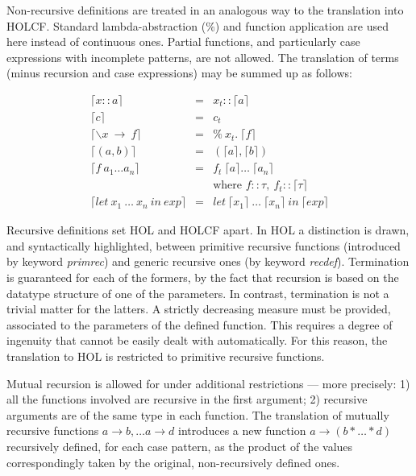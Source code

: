 \documentclass[a4paper,12pt]{article}
\begin{document}
Non-recursive definitions are treated in an analogous way to the
translation into HOLCF. Standard lambda-abstraction ($\%$) and
function application are used here instead of continuous ones. Partial
functions, and particularly case expressions with incomplete patterns,
are not allowed. The translation of terms (minus recursion and case
expressions) may be summed up as follows:

$$\begin{array}{lcl} 
  \lceil x::a \rceil & = & x_{t}::\lceil a \rceil \\
  \lceil c \rceil & = & c_{t} \\
  \lceil \backslash x \ \to \ f \rceil & = & \% \ x_{t}. \ \lceil f \rceil \\
  \lceil (a,b) \rceil & = & (\lceil a \rceil, \lceil b \rceil) \\
  \lceil f \ a_{1} \ldots a_{n} \rceil & = & f_{t} \ \lceil a \rceil \ldots \  \lceil a_{n} \rceil \\
  & & \mbox{where } f::\tau, \ f_{t}::\lceil \tau \rceil \\
  \lceil let \ x_{1} \ \dots \ x_{n} \ in \ exp \rceil & = 
  & let \ \lceil x_{1} \rceil \ \dots \ \lceil x_{n} \rceil \ in \ \lceil exp \rceil 
\end{array}$$

\noindent Recursive definitions set HOL and HOLCF apart.  In HOL a
distinction is drawn, and syntactically highlighted, between primitive
recursive functions (introduced by keyword \emph{primrec}) and generic
recursive ones (by keyword \emph{recdef}).  Termination is guaranteed
for each of the formers, by the fact that recursion is based on the
datatype structure of one of the parameters. In contrast, termination
is not a trivial matter for the latters. A strictly decreasing measure
must be provided, associated to the parameters of the defined
function. This requires a degree of ingenuity that cannot be easily
dealt with automatically. For this reason, the translation to HOL is
restricted to primitive recursive functions.

Mutual recursion is allowed for under additional restrictions --- more
precisely: 1) all the functions involved are recursive in the first
argument; 2) recursive arguments are of the same type in each
function.  The translation of mutually recursive functions $a
\rightarrow b, \ldots a \rightarrow d$ introduces a new function $a
\rightarrow (b * \ldots * d)$ recursively defined, for each case
pattern, as the product of the values
correspondingly taken by the original, non-recursively defined ones. \\
\end{document}
